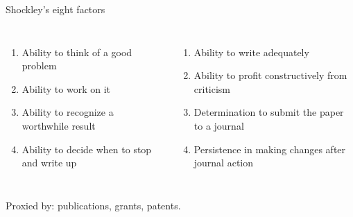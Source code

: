 \documentclass[aspectratio=169,11pt]{beamer}
\begin{document}
\begin{frame}{Shockley's eight factors}
\vspace{0.4em}
\begin{columns}[T]
\begin{enumerate}\small\setlength\itemsep{0.35em}
  \item Ability to think of a good problem
  \item Ability to work on it
  \item Ability to recognize a worthwhile result
  \item Ability to decide when to stop and write up
\end{enumerate}
\begin{enumerate}\small\setlength\itemsep{0.35em}\setcounter{enumi}{4}
  \item Ability to write adequately
  \item Ability to profit constructively from criticism
  \item Determination to submit the paper to a journal
  \item Persistence in making changes after journal action
\end{enumerate}
\end{columns}
\vspace{0.5em}
\begin{center}\color{warmgray}\small
Proxied by: publications, grants, patents.
\end{center}
\end{frame}
\end{document}
